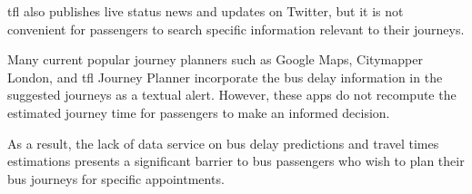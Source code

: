 \par \acrshort{tfl} also publishes live status news and updates on Twitter\cite{tfl_bus_alerts_twitter}, but it is not convenient for passengers to search specific information relevant to their journeys.

\par Many current popular journey planners such as Google Maps\cite{google_maps}, Citymapper London\cite{citymapper}, and \acrshort{tfl} Journey Planner incorporate the bus delay information in the suggested journeys as a textual alert. However, these apps do not recompute the estimated journey time for passengers to make an informed decision.

\par As a result, the lack of data service on bus delay predictions and travel times estimations presents a significant barrier to bus passengers who wish to plan their bus journeys for specific appointments.

